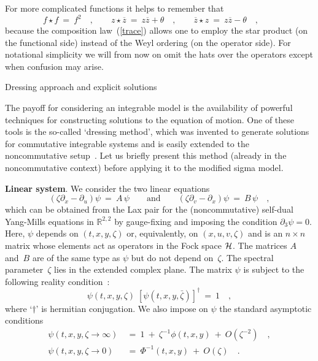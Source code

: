 \documentclass[a4paper,11pt]{article}
\makeatletter
\renewcommand{\section}{\@startsection{section}{1}{0pt}{\medskipamount}
{\medskipamount}{\large\bf}}
\numberwithin{equation}{section}
\def\th{\theta}
\newcommand{\R}{\mathbb R}
\newcommand{\Hcal}{{\cal H}}
\def\pa{\mbox{$\partial$}}
\newcommand{\zb}{\overline{z}}
\makeatother
\begin{document}
For more complicated functions it helps to remember that
\begin{equation}
f\star f\ =\ f^2 \quad,\qquad
z\star\zb\ =\ z\zb+\th \quad,\qquad
\zb\star z\ =\ z\zb-\th \quad,\qquad
\end{equation}
because the composition law~(\ref{trace}) allows one to employ the
star product (on the functional side) instead of the Weyl ordering
(on the operator side).
For notational simplicity we will from now on omit the hats over the operators
except when confusion may arise.


\section{Dressing approach and explicit solutions}

\noindent
The payoff for considering an integrable model is the availability of
powerful techniques for constructing solutions to the equation of motion.
One of these tools is the so-called `dressing method', which was invented to
generate solutions for commutative integrable systems
\cite{zakharov,zakh2,forgacs}
and is easily extended to the noncommutative setup~\cite{LPS2}.
Let us briefly present this method (already in the noncommutative context)
before applying it to the modified sigma model.

\noindent
{\bf Linear system}.
We consider the two linear equations
\begin{equation}\label{linsys}
(\zeta \pa_x -\pa_u)\psi\ =\ A\,\psi \qquad\textrm{and}\qquad
(\zeta \pa_v -\pa_x)\psi\ =\ B\,\psi \quad,
\end{equation}
which can be obtained from the Lax pair for the (noncommutative) self-dual
Yang-Mills equations in $\R^{2,2}$ \cite{IP2,ivle}
by gauge-fixing and imposing the condition $\pa_3 \psi =0$.
Here, $\psi$ depends on $(t,x,y,\zeta)$ or, equivalently, on $(x,u,v,\zeta)$
and is an $n{\times}n$ matrix whose elements act as operators in the Fock
space $\Hcal$. The matrices $A$ and~$B$ are of the same type as $\psi$ but
do not depend on~$\zeta$.
The spectral parameter~$\zeta$ lies in the extended complex plane.
The matrix $\psi$ is subject to the following
reality condition~\cite{ward}:
\begin{equation}\label{real}
\psi(t,x,y,\zeta)\;[\psi(t,x,y,\bar{\zeta})]^{\dagger}\ =\ 1 \quad,
\end{equation}
where `$\dagger$' is hermitian conjugation. We also impose on $\psi$ the
standard asymptotic conditions \cite{ivle}
\begin{align}
\psi(t,x,y,\zeta\to\infty)\ &=\ 1\ +\ \zeta^{-1}\phi(t,x,y)\ +\ O(\zeta^{-2})
\quad, \label{asymp1} \\[4pt]
\psi(t,x,y,\zeta\to0)\ &=\ \Phi^{-1}(t,x,y)\ +\ O(\zeta)\quad. \label{asymp2}
\end{align}
\end{document}
